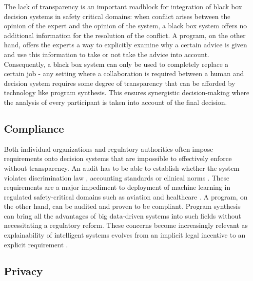 The lack of transparency is an important roadblock for integration of black box decision systems in safety critical domains: when conflict arises between the opinion of the expert and the opinion of the system, a black box system offers no additional information for the resolution of the conflict. 
A program, on the other hand, offers the experts a way to explicitly examine why a certain advice is given and use this information to take or not take the advice into account. 
Consequently, a black box system can only be used to completely replace a certain job - any setting where a collaboration is required between a human and decision system requires some degree of transparency that can be afforded by technology like program synthesis. 
This ensures synergistic decision-making where the analysis of every participant is taken into account of the final decision.

\subsection{Compliance}

Both individual organizations and regulatory authorities often impose requirements onto decision systems that are impossible to effectively enforce without transparency. 
An audit has to be able to establish whether the system violates discrimination law \cite{hochDiscriminationSakeFairness2024, schererApplyingOldRules2019}, accounting standards \cite{julischComplianceDesignBridging2011} or clinical norms \cite{flodgrenExternalInspectionCompliance}.
These requirements are a major impediment to deployment of machine learning in regulated safety-critical domains such as aviation \cite{torensGuidelinesRegulatoryFramework2021, vidotQualificationAvionicSoftware2024} and healthcare \cite{granlundRegulatoryCompliantMLOpsOravizio2021}.
A program, on the other hand, can be audited and proven to be compliant. 
Program synthesis can bring all the advantages of big data-driven systems into such fields without necessitating a regulatory reform.
These concerns become increasingly relevant as explainability of intelligent systems evolves from an implicit legal incentive \cite{hackerExplainableAIContract2020} to an explicit requirement \cite{linardatosExplainableAiReview2020}.

\subsection{Privacy}

